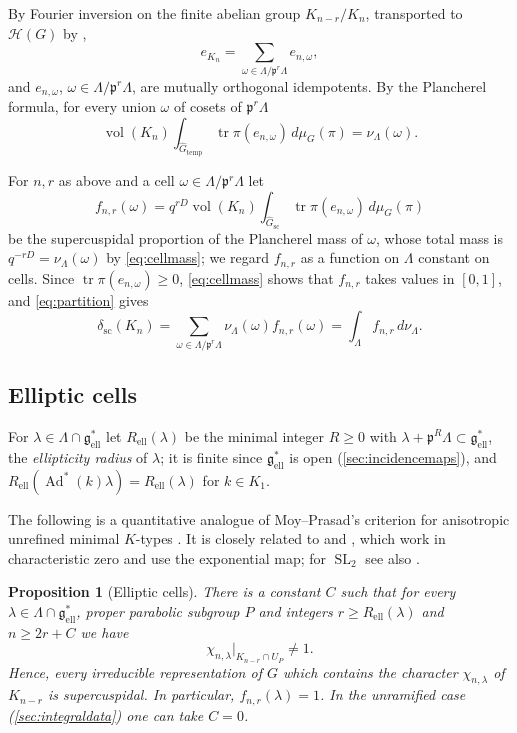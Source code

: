\documentclass[11pt,reqno]{amsart}
\numberwithin{equation}{section}
\theoremstyle{plain}
\newtheorem{proposition}[theorem]{Proposition}
\theoremstyle{definition}
\theoremstyle{remark}
\theoremstyle{plain}
\newcommand{\pp}{\mathfrak{p}}   %
\newcommand{\Lat}{\mathcal{L}}   %
\newcommand{\dLat}{\Lambda}      %
\newcommand{\g}{\mathfrak{g}}    %
\newcommand{\gd}{\mathfrak{g}^*} %
\newcommand{\Ell}[2][]{#2_{#1\mathrm{ell}}}   %
\newcommand{\scd}[1]{\delta_{\mathrm{sc}}(#1)}
\newcommand{\Hk}{\mathcal{H}}    %
\newcommand{\Gsc}{\widehat{G}_{\mathrm{sc}}}    %
\newcommand{\Gtemp}{\widehat{G}_{\mathrm{temp}}} %
\DeclareMathOperator{\vol}{vol}
\DeclareMathOperator{\tr}{tr}
\DeclareMathOperator{\Ad}{Ad}
\DeclareMathOperator{\SL}{SL}
\newcommand{\erad}{R_{\mathrm{ell}}}
\newcommand{\lf}{\lambda}
\newcommand{\cell}{\omega}
\begin{document}
By Fourier inversion on the finite abelian group $K_{n-r}/K_n$,
transported to $\Hk(G)$ by \cite[\S4.4]{MR2234120},
\begin{equation}\label{eq:partition}
e_{K_n}=\sum_{\cell\in \dLat/\pp^r\dLat}e_{n,\cell},
\end{equation}
and $e_{n,\cell}$, $\cell\in\dLat/\pp^r\dLat$, are mutually orthogonal idempotents.
By the Plancherel formula, for every union $\cell$ of cosets of $\pp^r\dLat$
\begin{equation}\label{eq:cellmass}
\vol(K_n)\int_{\Gtemp}\tr\pi(e_{n,\cell})\,d\mu_G(\pi)=\nu_{\dLat}(\cell).
\end{equation}

For $n,r$ as above and a cell $\cell\in \dLat/\pp^r\dLat$ let
\begin{equation}\label{eq:f}
f_{n,r}(\cell)=q^{rD}\vol(K_n)\int_{\Gsc}\tr\pi(e_{n,\cell})\,d\mu_G(\pi)
\end{equation}
be the supercuspidal proportion of the Plancherel mass of $\cell$, whose
total mass is $q^{-rD}=\nu_{\dLat}(\cell)$ by \eqref{eq:cellmass}; we regard $f_{n,r}$
as a function on $\dLat$ constant on cells. Since $\tr\pi(e_{n,\cell})\ge0$,
\eqref{eq:cellmass} shows that $f_{n,r}$ takes values in $[0,1]$, and
\eqref{eq:partition} gives
\begin{equation}\label{eq:Pscdecomp}
\scd{K_n}=\sum_{\cell\in \dLat/\pp^r\dLat}\nu_{\dLat}(\cell)f_{n,r}(\cell)=\int_\dLat f_{n,r}\,d\nu_{\dLat}.
\end{equation}


\subsection{Elliptic cells}\label{sec:elliptic}

For $\lf\in \dLat\cap\Ell{\gd}$ let $\erad(\lf)$ be the minimal integer $R\ge0$ with
$\lf+\pp^R\dLat\subset\Ell{\gd}$, the \emph{ellipticity radius} of $\lf$; it is
finite since $\Ell{\gd}$ is open (\cref{sec:incidencemaps}), and
$\erad(\Ad^*(k)\lf)=\erad(\lf)$ for $k\in K_1$.

The following is a quantitative analogue of Moy--Prasad's criterion
for anisotropic unrefined minimal $K$-types \cite[Corollary~4.9]{MR1371680}.
It is closely related to \cite{MR3463423} and \cite[Appendix~D]{MR4325284}, which work in
characteristic zero and use the exponential map; for $\SL_2$ see also
\cite[\S6.1]{MR3753921}.

\begin{proposition}[Elliptic cells]\label{prop:elliptic}
There is a constant $C$ such that for every $\lf\in \dLat\cap\Ell{\gd}$, proper parabolic subgroup $P$ and integers $r\ge\erad(\lf)$ and $n\ge 2r+C$ we have 
\begin{equation}\label{eq:nontrivialonU}
\chi_{n,\lf}|_{K_{n-r}\cap U_P}\ne1.
\end{equation}
Hence, every irreducible representation of $G$ which contains the character $\chi_{n,\lf}$ of $K_{n-r}$ is
supercuspidal. In particular, $f_{n,r}(\lf)=1$.
In the unramified case (\cref{sec:integraldata}) one can take $C=0$.
\end{proposition}
\end{document}
